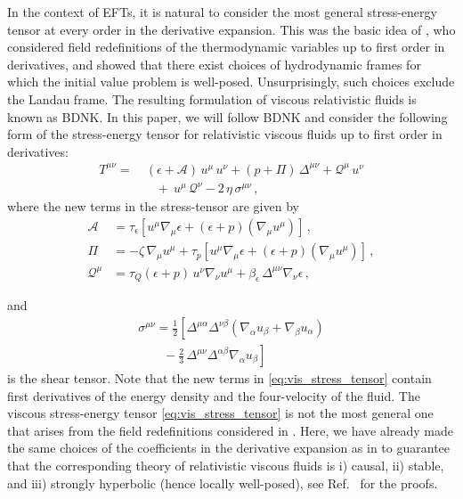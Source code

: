 \documentclass[prd,aps,twocolumn,floats,floatfix,nofootinbib,superscriptaddress] {revtex4-1}
\begin{document}
In the context of EFTs, it is natural to consider the most general stress-energy tensor at every order in the derivative expansion. This was the basic idea of \cite{Bemfica:2017wps,Kovtun:2019hdm}, who considered field redefinitions of the thermodynamic variables up to first order in derivatives, and showed that there exist choices of hydrodynamic frames for which the initial value problem is well-posed. Unsurprisingly, such choices exclude the Landau frame. The resulting formulation of viscous relativistic fluids is known as BDNK. In this paper, we will follow BDNK and consider the following form of the stress-energy tensor for relativistic viscous fluids up to first order in derivatives:
\begin{align}
T^{\mu\nu}  = &~ (\epsilon + \mathcal{A})\,u^\mu\,u^\nu+(p+\Pi)\,\Delta^{\mu\nu}+\mathcal{Q}^\mu\,u^\nu\nonumber \\
   & \quad +~u^\mu\,\mathcal{Q}^\nu-2\,\eta\,\sigma^{\mu\nu}\,,    
\label{eq:vis_stress_tensor}
\end{align}
where the new terms in the stress-tensor are given by
\begin{align*}
\mathcal{A} &= \tau_\epsilon\left[ u^\mu\nabla_\mu\epsilon + (\epsilon+p)(\nabla_\mu u^\mu)\right]\,,\\
\Pi &= -\zeta\,\nabla_\mu u^\mu + \tau_p\left[ u^\mu\nabla_\mu\epsilon + (\epsilon+p)(\nabla_\mu u^\mu)\right]\,, \\
\mathcal{Q}^\mu &= \tau_Q(\epsilon + p)\,u^\nu\nabla_\nu u^\mu+\beta_\epsilon\,\Delta^{\mu\nu}\nabla_\nu\epsilon\,,    
\end{align*}

and
\begin{align}
    \sigma^{\mu\nu} = \tfrac{1}{2}\left[\Delta^{\mu\alpha}\Delta^{\nu\beta}(\nabla_\alpha u_\beta+\nabla_\beta u_\alpha)\right.\nonumber \\
    \left.\qquad     -\tfrac{2}{3}\,\Delta^{\mu\nu}\Delta^{\alpha\beta}\nabla_\alpha u_\beta\right]\, \label{eq:shear}
\end{align}
is the shear tensor. 
%
Note that the new terms in \eqref{eq:vis_stress_tensor} contain first derivatives of the energy density and the four-velocity of the fluid. The viscous stress-energy tensor \eqref{eq:vis_stress_tensor} is not the most general one that arises from the field redefinitions considered in \cite{Bemfica:2017wps,Kovtun:2019hdm,Hoult:2020eho}. Here, we have already made the same choices of the coefficients in the derivative expansion as in \cite{Bemfica:2020zjp} to guarantee that the corresponding theory of relativistic viscous fluids is i) causal, ii) stable, and iii) strongly hyperbolic (hence locally well-posed), see Ref.~\cite{Bemfica:2020zjp} for the proofs.
\end{document}
